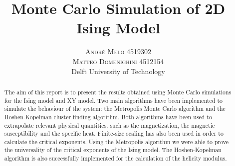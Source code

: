 \documentclass[twoside]{article}
\title{\vspace{-15mm}\fontsize{24pt}{10pt}\selectfont\textbf{Monte Carlo Simulation of 2D Ising Model}} %
\author{
\large
\textsc{Andr\'e Melo 4519302}\\
\textsc{Matteo Domenighini 4512154} \\[2mm] %
\normalsize Delft University of Technology\\ %
\vspace{-5mm}
}
\date{}
\begin{document}
\maketitle %


\begin{abstract}

\noindent The aim of this report is to present the results obtained using Monte Carlo simulations for the Ising model and XY model. Two main algorithms have been implemented to simulate the behaviour of the system: the Metropolis Monte Carlo algorithm and the Hoshen-Kopelman cluster finding algorithm. Both algorithms have been used to extrapolate relevant physical quantities, such as the magnetization, the magnetic susceptibility and the specific heat. Finite-size scaling has also been used in order to calculate the critical exponents. Using the Metropolis algorithm we were able to prove the universality of the critical exponents of the Ising model. 
The Hoshen-Kopelman algorithm is also successfully implemented for the calculation of the helicity modulus.

\end{abstract}

\end{document}
